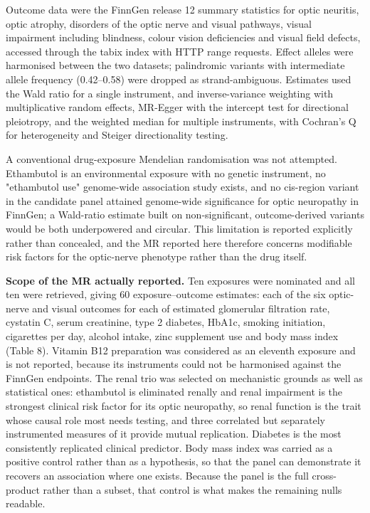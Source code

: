 \documentclass[utf8]{FrontiersinVancouver}
\begin{document}
Outcome data were the FinnGen release 12 summary statistics for optic neuritis, optic atrophy, disorders of the optic nerve and visual pathways, visual impairment including blindness, colour vision deficiencies and visual field defects, accessed through the tabix index with HTTP range requests. Effect alleles were harmonised between the two datasets; palindromic variants with intermediate allele frequency (0.42--0.58) were dropped as strand-ambiguous. Estimates used the Wald ratio for a single instrument, and inverse-variance weighting with multiplicative random effects, MR-Egger with the intercept test for directional pleiotropy, and the weighted median for multiple instruments, with Cochran's Q for heterogeneity and Steiger directionality testing.

A conventional drug-exposure Mendelian randomisation was not attempted. Ethambutol is an environmental exposure with no genetic instrument, no "ethambutol use" genome-wide association study exists, and no cis-region variant in the candidate panel attained genome-wide significance for optic neuropathy in FinnGen; a Wald-ratio estimate built on non-significant, outcome-derived variants would be both underpowered and circular. This limitation is reported explicitly rather than concealed, and the MR reported here therefore concerns modifiable risk factors for the optic-nerve phenotype rather than the drug itself.

\textbf{Scope of the MR actually reported.} Ten exposures were nominated and all ten were retrieved, giving 60 exposure--outcome estimates: each of the six optic-nerve and visual outcomes for each of estimated glomerular filtration rate, cystatin C, serum creatinine, type 2 diabetes, HbA1c, smoking initiation, cigarettes per day, alcohol intake, zinc supplement use and body mass index (Table 8). Vitamin B12 preparation was considered as an eleventh exposure and is not reported, because its instruments could not be harmonised against the FinnGen endpoints. The renal trio was selected on mechanistic grounds as well as statistical ones: ethambutol is eliminated renally and renal impairment is the strongest clinical risk factor for its optic neuropathy, so renal function is the trait whose causal role most needs testing, and three correlated but separately instrumented measures of it provide mutual replication. Diabetes is the most consistently replicated clinical predictor. Body mass index was carried as a positive control rather than as a hypothesis, so that the panel can demonstrate it recovers an association where one exists. Because the panel is the full cross-product rather than a subset, that control is what makes the remaining nulls readable.
\end{document}
